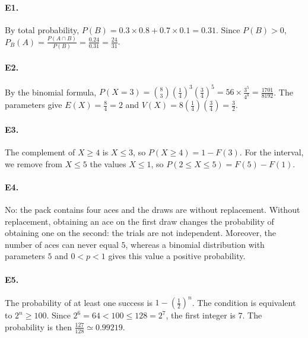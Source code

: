 \paragraph{E1.}By total probability, $P(B)=\num{0,3}\times\num{0,8}+\num{0,7}\times\num{0,1}=\num{0,31}$. Since $P(B)>0$, $P_B(A)=\frac{P(A\cap B)}{P(B)}=\frac{\num{0,24}}{\num{0,31}}=\frac{24}{31}$.

\paragraph{E2.}By the binomial formula, $P(X=3)=\binom{8}{3}(\frac{1}{4})^3(\frac{3}{4})^5=56\times\frac{3^5}{4^8}=\frac{1701}{8192}$. The parameters give $E(X)=\frac{8}{4}=2$ and $V(X)=8(\frac{1}{4})(\frac{3}{4})=\frac{3}{2}$.

\paragraph{E3.}The complement of $X\ge4$ is $X\le3$, so $P(X\ge4)=1-F(3)$. For the interval, we remove from $X\le5$ the values $X\le1$, so $P(2\le X\le5)=F(5)-F(1)$.

\paragraph{E4.}No: the pack contains four aces and the draws are without replacement. Without replacement, obtaining an ace on the first draw changes the probability of obtaining one on the second: the trials are not independent. Moreover, the number of aces can never equal $5$, whereas a binomial distribution with parameters $5$ and $0<p<1$ gives this value a positive probability.

\paragraph{E5.}The probability of at least one success is $1-(\frac{1}{2})^n$. The condition is equivalent to $2^n\ge100$. Since $2^6=64<100\le128=2^7$, the first integer is $7$. The probability is then $\frac{127}{128}\simeq\num{0,99219}$.

